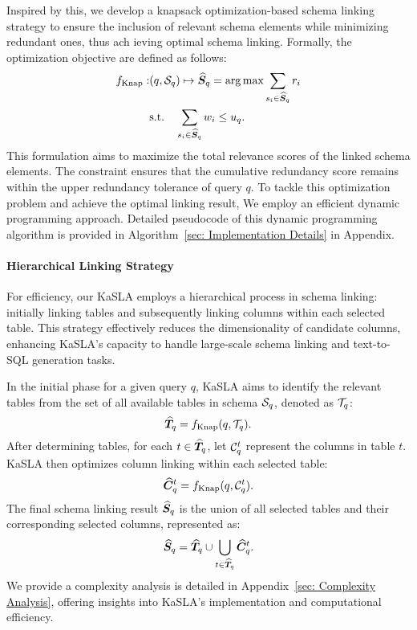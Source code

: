 Inspired by this, we develop a knapsack optimization-based schema linking strategy to ensure the inclusion of relevant schema elements while minimizing redundant ones, thus ach ieving optimal schema linking. Formally, the optimization objective are defined as follows:
\begin{equation}
\begin{split}
    f_{\text{Knap}}:& (q, {\mathcal{S}}_q) \mapsto \widehat{{\bm{S}}}_q  = \arg\max \sum_{s_i \in \widehat{{\bm{S}}}_q} r_i \\&  \text{s.t.} \quad \sum_{s_i \in \widehat{{\bm{S}}}_q} w_i \leq u_q.
\end{split}
\end{equation}
This formulation aims to maximize the total relevance scores of the linked schema elements. The constraint ensures that the cumulative redundancy score remains within the upper redundancy tolerance of query $q$. To tackle this optimization problem and achieve the optimal linking result, We employ an efficient dynamic programming approach. Detailed pseudocode of this dynamic programming algorithm is provided in Algorithm~\ref{sec: Implementation Details} in Appendix.

\paragraph{Hierarchical Linking Strategy}
For efficiency, our KaSLA employs a hierarchical process in schema linking: initially linking tables and subsequently linking columns within each selected table. This strategy effectively reduces the dimensionality of candidate columns, enhancing KaSLA's capacity to handle large-scale schema linking and text-to-SQL generation tasks.

In the initial phase for a given query $q$, KaSLA aims to identify the relevant tables from the set of all available tables in schema ${\mathcal{S}}_q$, denoted as ${\mathcal{T}}_q$:
\begin{equation}
\widehat{{\bm{T}}}_q  = f_{\text{Knap}}(q, {\mathcal{T}}_q).
\end{equation}
After determining tables, for each $t \in \widehat{{\bm{T}}}_q$, let ${\mathcal{C}}^t_q$ represent the columns in table $t$. KaSLA then optimizes column linking within each selected table:
\begin{equation}
\widehat{{\bm{C}}}^t_q  = f_{\text{Knap}}(q, {\mathcal{C}}^t_q).
\end{equation}
The final schema linking result $\widehat{{\bm{S}}}_q$ is the union of all selected tables and their corresponding selected columns, represented as:
\begin{equation}
\widehat{{\bm{S}}}_q = \widehat{{\bm{T}}}_q \cup \bigcup_{t \in \widehat{{\bm{T}}}_q} \widehat{{\bm{C}}}^t_q.
\end{equation}
We provide a complexity analysis is detailed in Appendix~\ref{sec: Complexity Analysis}, offering insights into KaSLA's implementation and computational efficiency.




















